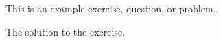 \begin{exercise}
    This is an example exercise, question, or problem.
\end{exercise}

\begin{solution}
    The solution to the exercise.
\end{solution}
